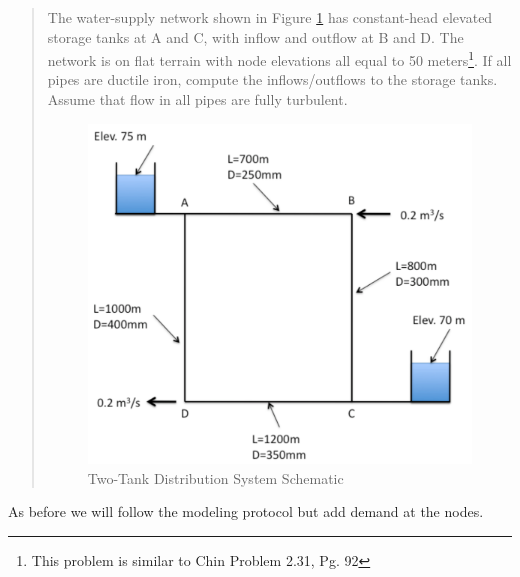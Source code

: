 \begin{quote}
The water-supply network shown in Figure \ref{fig:p231} has constant-head elevated storage tanks at A and C, with inflow and outflow at B and D.  The network is on flat terrain with node elevations all equal to 50 meters\footnote{This problem is similar to Chin Problem 2.31, Pg. 92}.  If all pipes are ductile iron, compute the inflows/outflows to the storage tanks.   Assume that flow in all pipes are fully turbulent.

\begin{figure}[htbp] %
   \centering
   \includegraphics[width=5in]{p231.pdf} 
   \caption{Two-Tank Distribution System Schematic}
   \label{fig:p231}
\end{figure}
\end{quote}

As before we will follow the modeling protocol but add demand at the nodes.

